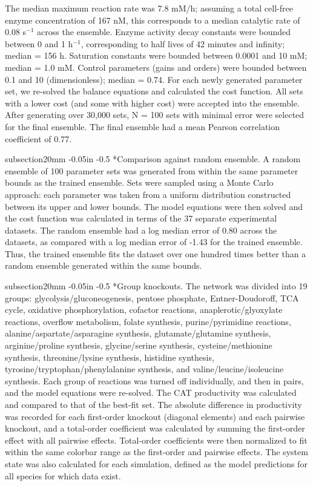 \documentclass[12pt]{article}
\makeatletter
\renewcommand\subsection{\@startsection
	{subsection}{2}{0mm}
	{-0.05in}
	{-0.5\baselineskip}
	{\normalfont\normalsize\bfseries}}
\makeatother
\begin{document}
The median maximum reaction rate was 7.8 mM/h; assuming a total cell-free enzyme concentration of 167 nM, this corresponds to a median catalytic rate of 0.08 s$^{-1}$ across the ensemble.
Enzyme activity decay constants were bounded between 0 and 1 h$^{-1}$, corresponding to half lives of 42 minutes and infinity; median = 156 h.
Saturation constants were bounded between 0.0001 and 10 mM; median = 1.0 mM.
Control parameters (gains and orders) were bounded between 0.1 and 10 (dimensionless); median = 0.74.
For each newly generated parameter set, we re-solved the balance equations and calculated the cost function.
All sets with a lower cost (and some with higher cost) were accepted into the ensemble.
After generating over 30,000 sets, N = 100 sets with minimal error were selected for the final ensemble.
The final ensemble had a mean Pearson correlation coefficient of 0.77.

\subsection*{Comparison against random ensemble.}
A random ensemble of 100 parameter sets was generated from within the same parameter bounds as the trained ensemble.
Sets were sampled using a Monte Carlo approach: each parameter was taken from a uniform distribution constructed between its upper and lower bounds.
The model equations were then solved and the cost function was calculated in terms of the 37 separate experimental datasets.
The random ensemble had a log median error of 0.80 across the datasets, as compared with a log median error of -1.43 for the trained ensemble.
Thus, the trained ensemble fits the dataset over one hundred times better than a random ensemble generated within the same bounds.

\subsection*{Group knockouts.}
The network was divided into 19 groups: glycolysis\slash gluconeogenesis, pentose phosphate, Entner-Doudoroff, TCA cycle, oxidative phosphorylation, cofactor reactions, anaplerotic\slash glyoxylate reactions, overflow metabolism, folate synthesis, purine\slash pyrimidine reactions, alanine\slash aspartate\slash asparagine synthesis, glutamate\slash glutamine synthesis, arginine\slash proline synthesis, glycine\slash serine synthesis, cysteine\slash methionine synthesis, threonine\slash lysine synthesis, histidine synthesis, tyrosine\slash tryptophan\slash phenylalanine synthesis, and valine\slash leucine\slash isoleucine synthesis.
Each group of reactions was turned off individually, and then in pairs, and the model equations were re-solved.
The CAT productivity was calculated and compared to that of the best-fit set.
The absolute difference in productivity was recorded for each first-order knockout (diagonal elements) and each pairwise knockout, and a total-order coefficient was calculated by summing the first-order effect with all pairwise effects.
Total-order coefficients were then normalized to fit within the same colorbar range as the first-order and pairwise effects.
The system state was also calculated for each simulation, defined as the model predictions for all species for which data exist.
\end{document}
